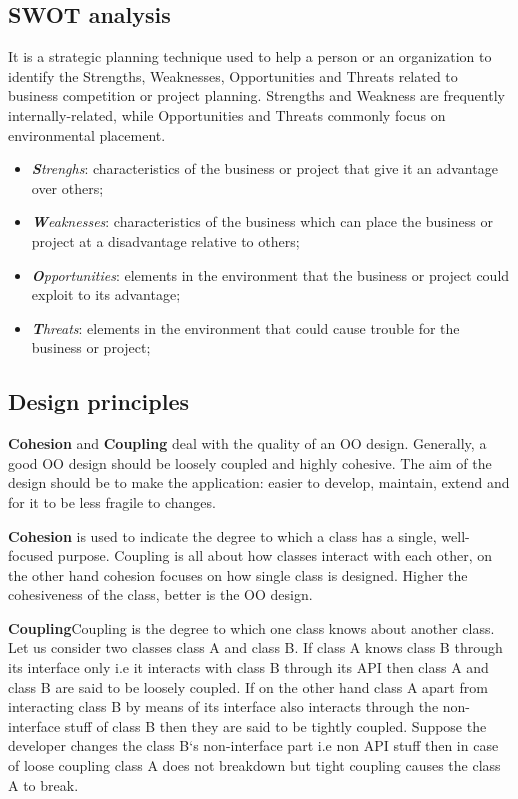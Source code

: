 \documentclass{article}
\begin{document}
		\subsection{SWOT analysis}
			It is a strategic planning technique used to help a person or an organization to identify the Strengths, Weaknesses, Opportunities and Threats related to business competition or project planning. Strengths and Weakness are frequently internally-related, while Opportunities and Threats commonly focus on environmental placement.

			\begin{itemize}
				\item \textit{\textbf{S}trenghs}: characteristics of the business or project that give it an advantage over others;
				\item \textit{\textbf{W}eaknesses}: characteristics of the business which can place the business or project at a disadvantage relative to others;
				\item \textit{\textbf{O}pportunities}: elements in the environment that the business or project could exploit to its advantage;
				\item \textit{\textbf{T}hreats}: elements in the environment that could cause trouble for the business or project;
			\end{itemize}

		\subsection{Design principles}
			\textbf{Cohesion} and \textbf{Coupling} deal with the quality of an OO design. Generally, a good OO design should be loosely coupled and highly cohesive. The aim of the design should be to make the application: easier to develop, maintain, extend and for it to be less fragile to changes.

			\bigskip
			\textbf{Cohesion} is used to indicate the degree to which a class has a single, well-focused purpose. Coupling is all about how classes interact with each other, on the other hand cohesion focuses on how single class is designed. Higher the cohesiveness of the class, better is the OO design.

			\bigskip
			\textbf{Coupling}Coupling is the degree to which one class knows about another class. Let us consider two classes class A and class B. If class A knows class B through its interface only i.e it interacts with class B through its API then class A and class B are said to be loosely coupled. If on the other hand class A apart from interacting class B by means of its interface also interacts through the non-interface stuff of class B then they are said to be tightly  coupled. Suppose the developer changes the class B‘s non-interface part i.e non API stuff then in case of loose coupling class A does not breakdown but tight coupling causes the class A to break.
\end{document}
